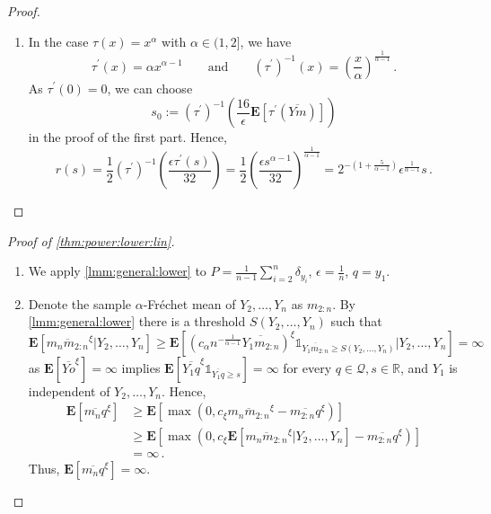 \documentclass{article}
\newcommand*{\mc}[1]{\mathcal{#1}}
\newcommand{\R}{\mathbb{R}}
\newcommand{\lab}{\left[} %
\newcommand{\rab}{\right]} %
\newcommand{\ab}[1]{\lab #1 \rab} %
\newcommand{\abOf}[1]{\!\ab{#1}} %
\newcommand{\lb}{\left(} %
\newcommand{\rb}{\right)} %
\newcommand{\br}[1]{\lb #1 \rb} %
\newcommand{\brOf}[1]{\!\br{#1}} %
\newcommand{\E}{\mathbf{E}} %
\newcommand{\Eof}[1]{\E[#1]}
\newcommand{\EOf}[1]{\E\abOf{#1}}
\newcommand{\pr}{^\prime}
\newcommand{\ind}{\mathds{1}}%
\newcommand{\indOf}[1]{\ind_{\!#1}}%
\newcommand{\eqfs}{\,.}
\newcommand{\ol}[2]{\overline{#1#2}}
\newcommand{\tran}{\tau}
\newcommand{\dtran}{\tau\pr}
\newcommand{\invdtran}{(\tau\pr)^{-1}}
\begin{document}
\begin{proof}
\begin{enumerate}[label=(\roman*)]
        Hence, for the $\tran$-Fr\'echet mean $\tilde m$ of $\tilde Y$, we have $\ol m{\tilde m} \geq r$.
        \item
        In the case $\tran(x)=x^\alpha$ with $\alpha\in(1,2]$, we have
        \begin{equation}
            \dtran(x) = \alpha x^{\alpha-1}
            \qquad\text{and}\qquad
            \invdtran(x) = \br{\frac{x}\alpha}^{\frac1{\alpha-1}}
            \eqfs
        \end{equation}
        As $\dtran(0)=0$, we can choose 
        \begin{equation}
            s_0 := \invdtran\brOf{\frac{16}{\epsilon} \EOf{\dtran(\ol {Y}m)}}
        \end{equation}
        in the proof of the first part.
        Hence,
        \begin{equation}
            r(s) 
            =
            \frac12 \invdtran\brOf{\frac{\epsilon \dtran(s)}{32}}
            =
            \frac12 \br{\frac{\epsilon s^{\alpha-1}}{32}}^{\frac{1}{\alpha-1}}
            =
            2^{-\br{1+\frac{5}{\alpha-1}}} \epsilon^{\frac{1}{\alpha-1}} s
            \eqfs
        \end{equation}
    \end{enumerate}
\end{proof}
%
\begin{proof}[Proof of \cref{thm:power:lower:lin}]
    \begin{enumerate}[label=(\roman*)]
        \item 
        We apply \cref{lmm:general:lower} to $P = \frac{1}{n-1}\sum_{i=2}^n \delta_{y_i}$, $\epsilon = \frac1n$, $q=y_1$.
        \item 
        Denote the sample $\alpha$-Fr\'echet mean of $Y_2, \dots, Y_n$ as $m_{2:n}$.
        By \cref{lmm:general:lower} there is a threshold $S(Y_2,\dots,Y_n)$ such that
        \begin{equation}
            \EOf{\ol {m_{n}}{m_{2:n}}^\xi | Y_2,\dots,Y_n} 
            \geq 
            \EOf{\br{c_\alpha n^{-\frac{1}{\alpha-1}} \ol {Y_1}{m_{2:n}}}^\xi \indOf{\ol {Y_1}{m_{2:n}} \geq S(Y_2,\dots,Y_n)}| Y_2,\dots,Y_n} 
            =
            \infty
        \end{equation}
        as $\Eof{\ol {Y}o^\xi} = \infty$ implies $\Eof{\ol {Y_1}q^\xi \indOf{\ol {Y_1}q \geq s}} = \infty$ for every $q\in\mc Q, s\in \R$, and $Y_1$ is independent of $Y_2, \dots, Y_n$.
        Hence, 
        \begin{align}
            \EOf{\ol {m_n}q^\xi} 
            &\geq 
            \EOf{\max\brOf{0, c_\xi \ol {m_{n}}{m_{2:n}}^\xi - \ol {m_{2:n}}{q}^\xi}} 
            \\ &\geq 
            \EOf{\max\brOf{0, c_\xi \EOf{\ol {m_{n}}{m_{2:n}}^\xi | Y_2,\dots,Y_n} - \ol {m_{2:n}}{q}^\xi}}
            \\ &= 
            \infty
            \eqfs
        \end{align}
        Thus, $\EOf{\ol {m_n}q^\xi}  = \infty$.
    \end{enumerate}
\end{proof}
%
\end{document}
